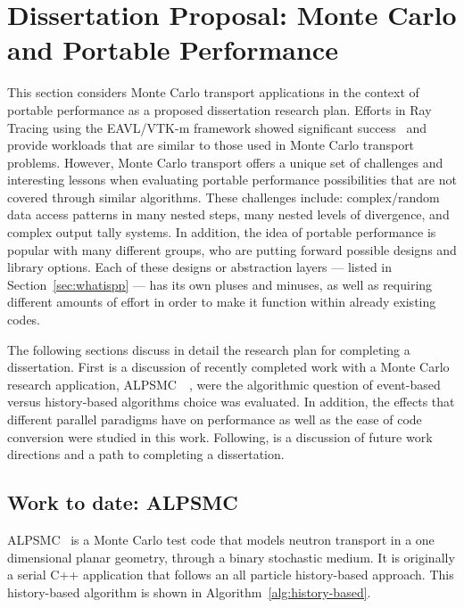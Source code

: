 \section{\textbf{Dissertation Proposal: Monte Carlo and Portable Performance}}

This section considers Monte Carlo transport applications in the context of portable performance as a proposed dissertation research plan.
%
Efforts in Ray Tracing using the EAVL/VTK-m framework showed significant success~\cite{larsen2015ray} and provide workloads that are similar to those used in Monte Carlo transport problems.
%
However, Monte Carlo transport offers a unique set of challenges and interesting lessons when evaluating portable performance possibilities that are not covered through similar algorithms.
%
These challenges include: complex/random data access patterns in many nested steps, many nested levels of divergence, and complex output tally systems.
%
In addition, the idea of portable performance is popular with many different groups, who are putting forward possible designs and library options.
%
Each of these designs or abstraction layers --- listed in Section~\ref{sec:whatispp} --- has its own pluses and minuses, as well as requiring different amounts of effort in order to make it function within already existing codes.
%

%
The following sections discuss in detail the research plan for completing a dissertation.
%
First is a discussion of recently completed work with a Monte Carlo research application, ALPSMC~\cite{alpsmc1}~\cite{alpsmc2}, were the algorithmic question of event-based versus history-based algorithms choice was evaluated.
%
In addition, the effects that different parallel paradigms have on performance as well as the ease of code conversion were studied in this work.
%
Following, is a discussion of future work directions and a path to completing a dissertation.

\subsection{\textbf{Work to date: ALPSMC}}

ALPSMC~\cite{brantley2011benchmark} is a Monte Carlo test code that models neutron transport in a one dimensional planar geometry, through a binary stochastic medium.
%
It is originally a serial C++ application that follows an all particle history-based approach.
%
This history-based algorithm is shown in Algorithm~\ref{alg:history-based}.
%

